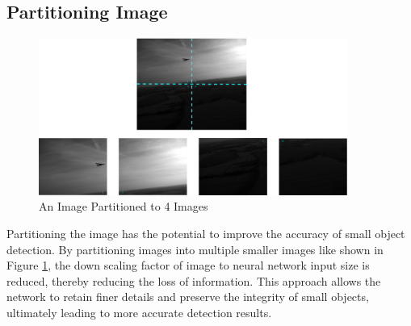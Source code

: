   \subsection{Partitioning Image}
  \begin{figure}[p]
    \centering
    \includegraphics[width=0.9\textwidth]{figures/imagepartition.png}
    \caption{An Image Partitioned to 4 Images}
    \label{fig:imagepartition}
  \end{figure}
  Partitioning the image has the potential to improve the accuracy of small object detection.
  By partitioning images into multiple smaller images like shown in Figure \ref{fig:imagepartition}, the down scaling factor of image to neural network input size is reduced, thereby reducing the loss of information.
  This approach allows the network to retain finer details and preserve the integrity of small objects, ultimately leading to more accurate detection results.

